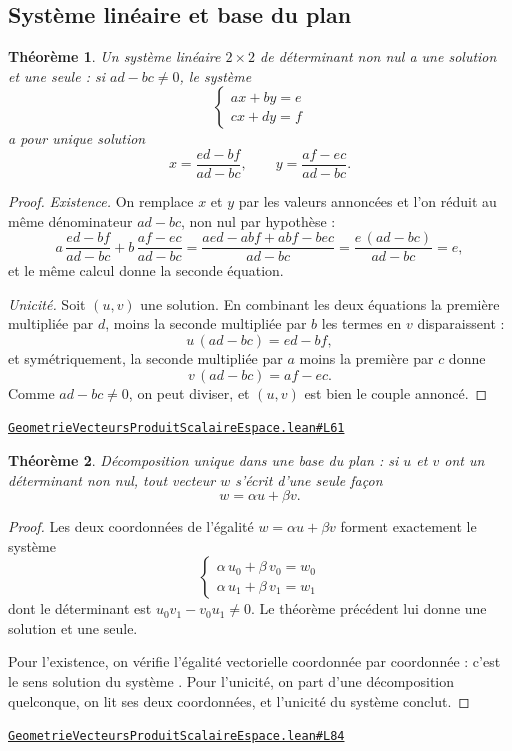 \documentclass[11pt,a4paper]{article}
\theoremstyle{definition}
\theoremstyle{plain}
\newtheorem{theoreme}{Théorème}
\newcommand{\source}[2]{\par\smallskip\noindent\hfill{\footnotesize\href{#1}{\texttt{#2}}}\par\smallskip}
\begin{document}
\subsection{Système linéaire et base du plan}

\begin{theoreme}
Un système linéaire $2 \times 2$ de déterminant non nul a une solution et une seule :
si $ad - bc \ne 0$, le système
\[ \begin{cases} ax + by = e \\ cx + dy = f \end{cases} \]
a pour unique solution
\[ x = \frac{ed - bf}{ad - bc}, \qquad y = \frac{af - ec}{ad - bc} . \]
\end{theoreme}

\begin{proof}
\emph{Existence.} On remplace $x$ et $y$ par les valeurs annoncées et l'on réduit au même
dénominateur $ad - bc$, non nul par hypothèse :
\[ a\,\frac{ed - bf}{ad - bc} + b\,\frac{af - ec}{ad - bc}
   = \frac{aed - abf + abf - bec}{ad - bc}
   = \frac{e\,(ad - bc)}{ad - bc} = e , \]
et le même calcul donne la seconde équation.

\emph{Unicité.} Soit $(u, v)$ une solution. En combinant les deux équations \textemdash{}
la première multipliée par $d$, moins la seconde multipliée par $b$ \textemdash{} les
termes en $v$ disparaissent :
\[ u\,(ad - bc) = ed - bf , \]
et symétriquement, la seconde multipliée par $a$ moins la première par $c$ donne
\[ v\,(ad - bc) = af - ec . \]
Comme $ad - bc \ne 0$, on peut diviser, et $(u, v)$ est bien le couple annoncé.
\end{proof}
\source{https://github.com/Commutator-IO/learn-lean/blob/main/cours/02-lycee/08-geometrie-vecteurs-produit-scalaire-espace/GeometrieVecteursProduitScalaireEspace.lean\#L61}{GeometrieVecteursProduitScalaireEspace.lean\#L61}

\begin{theoreme}
Décomposition unique dans une base du plan : si $u$ et $v$ ont un déterminant non nul,
tout vecteur $w$ s'écrit d'une seule façon
\[ w = \alpha u + \beta v . \]
\end{theoreme}

\begin{proof}
Les deux coordonnées de l'égalité $w = \alpha u + \beta v$ forment exactement le système
\[ \begin{cases} \alpha\,u_0 + \beta\,v_0 = w_0 \\ \alpha\,u_1 + \beta\,v_1 = w_1 \end{cases} \]
dont le déterminant est $u_0 v_1 - v_0 u_1 \ne 0$. Le théorème précédent lui donne une
solution et une seule.

Pour l'existence, on vérifie l'égalité vectorielle coordonnée par coordonnée : c'est le
sens \og{} solution du système \fg{}. Pour l'unicité, on part d'une décomposition
quelconque, on lit ses deux coordonnées, et l'unicité du système conclut.
\end{proof}
\source{https://github.com/Commutator-IO/learn-lean/blob/main/cours/02-lycee/08-geometrie-vecteurs-produit-scalaire-espace/GeometrieVecteursProduitScalaireEspace.lean\#L84}{GeometrieVecteursProduitScalaireEspace.lean\#L84}
\end{document}
